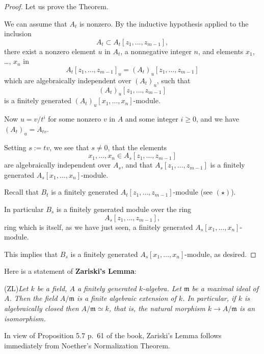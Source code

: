\documentclass[parskip=half,fontsize=12pt]{scrartcl}%
\newcommand{\mf}{\mathfrak}
\newcommand{\mmm}{\mf m}
\begin{document}
\begin{proof}
Let us prove the Theorem.

We can assume that $A_t$ is nonzero. By the inductive hypothesis applied to the inclusion 
$$
A_t\subset A_t[z_1,\dots,z_{m-1}],
$$ 
there exist a nonzero element $u$ in $A_t$, a nonnegative integer $n$, and elements $x_1$, \dots, $x_n$ in 
$$
A_t[z_1,\dots,z_{m-1}]_u=(A_t)_u[z_1,\dots,z_{m-1}]
$$ 
which are algebraically independent over $(A_t)_u$, such that 
$$
(A_t)_u[z_1,\dots,z_{m-1}]
$$ 
is a finitely generated $(A_t)_u[x_1,\dots,x_n]$-module. 

Now $u=v/t^i$ for some nonzero $v$ in $A$ and some integer $i\ge0$, and we have $(A_t)_u=A_{tv}$. 

Setting $s:=tv$, we see that $s\ne0$, that the elements 
$$
x_1,\dots,x_n\in A_s[z_1,\dots,z_{m-1}]
$$ 
are algebraically independent over $A_s$, and that $A_s[z_1,\dots,z_{m-1}]$ is a finitely generated $A_s[x_1,\dots,x_n]$-module. 

Recall that $B_t$ is a finitely generated $A_t[z_1,\dots,z_{m-1}]$-module (see $(\star)$). 

In particular $B_s$ is a finitely generated module over the ring $$A_s[z_1,\dots,z_{m-1}],$$ ring which is itself, as we have just seen, a finitely generated $A_s[x_1,\dots,x_n]$-module. 

This implies that $B_s$ is a finitely generated $A_s[x_1,\dots,x_n]$-module, as desired.

\end{proof} 

Here is a statement of \textbf{Zariski's Lemma}:

(ZL)\emph{Let $k$ be a field, $A$ a finitely generated $k$-algebra. Let $\mmm$ be a maximal ideal of $A$. Then the field $A/\mmm$ is a finite algebraic extension of $k$. In particular, if $k$ is algebraically closed then $A/\mmm\simeq k$, that is, the natural morphism $k\to A/\mmm$ is an isomorphism.}

In view of Proposition 5.7 p.~61 of the book, Zariski's Lemma follows immediately from Noether's Normalization Theorem. %
\end{document}
